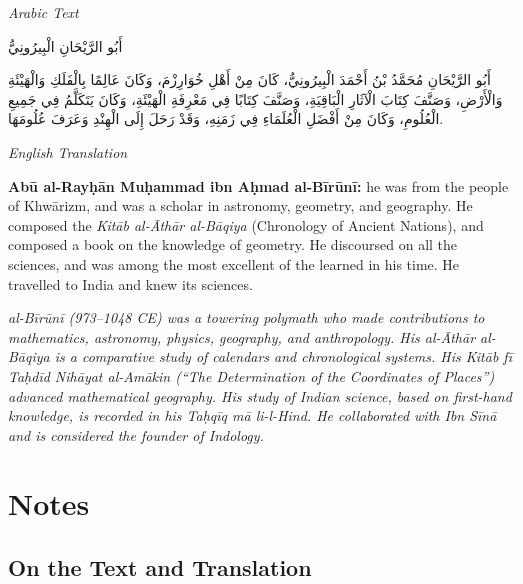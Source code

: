 \documentclass[11pt,a4paper]{article}
\newcommand{\cnote}[1]{\textcolor{notecolor}{\textit{#1}}}
\newenvironment{arabiccol}{%
  \begin{minipage}[t]{0.48\textwidth}%
  \begin{tcolorbox}[colback=leftbg,colframe=rulecolor,boxrule=0.4pt,arc=2pt,left=5pt,right=5pt,top=5pt,bottom=5pt]%
  \centering\textit{\footnotesize Arabic Text}\\[0.4em]%
  \raggedright\arabicfont\small%
}{%
  \end{tcolorbox}%
  \end{minipage}%
}
\newenvironment{englishcol}{%
  \begin{minipage}[t]{0.48\textwidth}%
  \begin{tcolorbox}[colback=rightbg,colframe=rulecolor,boxrule=0.4pt,arc=2pt,left=5pt,right=5pt,top=5pt,bottom=5pt]%
  \centering\textit{\footnotesize English Translation}\\[0.4em]%
  \raggedright\small%
}{%
  \end{tcolorbox}%
  \end{minipage}%
}
\begin{document}
\noindent
\begin{arabiccol}
\beginR
أَبُو الرَّيْحَانِ الْبِيرُونِيُّ

أَبُو الرَّيْحَانِ مُحَمَّدُ بْنُ أَحْمَدَ الْبِيرُونِيُّ، كَانَ مِنْ أَهْلِ خُوَارِزْمَ، وَكَانَ عَالِمًا بِالْفَلَكِ وَالْهَيْئَةِ وَالْأَرْضِ، وَصَنَّفَ كِتَابَ الْآثَارِ الْبَاقِيَةِ، وَصَنَّفَ كِتَابًا فِي مَعْرِفَةِ الْهَيْئَةِ، وَكَانَ يَتَكَلَّمُ فِي جَمِيعِ الْعُلُومِ، وَكَانَ مِنْ أَفْضَلِ الْعُلَمَاءِ فِي زَمَنِهِ، وَقَدْ رَحَلَ إِلَى الْهِنْدِ وَعَرَفَ عُلُومَهَا.
\endR
\end{arabiccol}
\hfill
\begin{englishcol}
\textbf{Abū al-Rayḥān Muḥammad ibn Aḥmad al-Bīrūnī:} he was from the people of Khwārizm, and was a scholar in astronomy, geometry, and geography. He composed the \textit{Kitāb al-Āthār al-Bāqiya} (Chronology of Ancient Nations), and composed a book on the knowledge of geometry. He discoursed on all the sciences, and was among the most excellent of the learned in his time. He travelled to India and knew its sciences.

\cnote{al-Bīrūnī (973--1048 CE) was a towering polymath who made contributions to mathematics, astronomy, physics, geography, and anthropology. His \textit{al-Āthār al-Bāqiya} is a comparative study of calendars and chronological systems. His \textit{Kitāb fī Taḥdīd Nihāyat al-Amākin} (``The Determination of the Coordinates of Places'') advanced mathematical geography. His study of Indian science, based on first-hand knowledge, is recorded in his \textit{Taḥqīq mā li-l-Hind}. He collaborated with Ibn Sīnā and is considered the founder of Indology.}
\end{englishcol}

\par\vspace{0.5em}

\newpage

\section{Notes}
\label{sec:editorial}

\subsection{On the Text and Translation}
\end{document}
